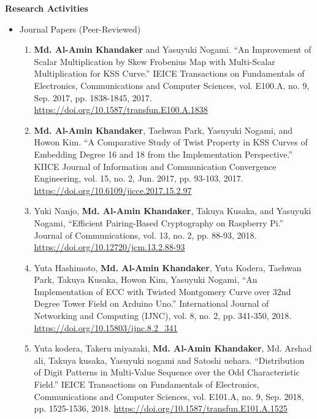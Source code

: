 
\newpage
\pagestyle{plain}
\textbf{\huge Research Activities}\label{research_activity}
\vspace{10mm}\\
\begin{itemize}
\large
\item Journal Papers (Peer-Reviewed)
\normalsize
\begin{enumerate}
		
	\item \textbf{Md. Al-Amin Khandaker} and Yasuyuki Nogami. ``An Improvement of Scalar Multiplication by Skew Frobenius Map with Multi-Scalar Multiplication for KSS Curve.'' IEICE Transactions on Fundamentals of Electronics, Communications and Computer Sciences, vol. E100.A, no. 9, Sep. 2017, pp. 1838-1845, 2017. \url{https://doi.org/10.1587/transfun.E100.A.1838}
	
	\item \textbf{Md. Al-Amin Khandaker}, Taehwan Park, Yasuyuki Nogami, and Howon Kim. ``A Comparative Study of Twist Property in KSS Curves of Embedding Degree 16 and 18 from the Implementation Perspective.'' KIICE Journal of Information and Communication Convergence Engineering, vol. 15, no. 2, Jun. 2017, pp. 93-103, 2017. \url{https://doi.org/10.6109/jicce.2017.15.2.97}
	
	\item Yuki Nanjo,  \textbf{Md. Al-Amin Khandaker}, Takuya Kusaka, and Yasuyuki Nogami, ``Efficient Pairing-Based Cryptography on Raspberry Pi.'' Journal of Communications, vol. 13, no. 2, pp. 88-93, 2018.  \url{https://doi.org/10.12720/jcm.13.2.88-93} 
		
	\item Yuta Hashimoto,  \textbf{Md. Al-Amin Khandaker}, Yuta Kodera, Taehwan Park, Takuya Kusaka, Howon Kim, Yasuyuki Nogami, ``An Implementation of ECC with Twisted Montgomery Curve over 32nd Degree Tower Field on Arduino Uno.'' International Journal of Networking and Computing (IJNC), vol. 8, no. 2, pp. 341-350, 2018.
	\url{https://doi.org/10.15803/ijnc.8.2_341}
	
	\item Yuta kodera, Takeru miyazaki, \textbf{Md. Al-Amin Khandaker},  Md. Arshad ali, Takuya kusaka, Yasuyuki nogami and Satoshi uehara. ``Distribution of Digit Patterns in Multi-Value Sequence over the Odd Characteristic Field.'' IEICE Transactions on Fundamentals of Electronics, Communications and Computer Sciences, vol. E101.A, no. 9, Sep. 2018, pp. 1525-1536, 2018. \url{https://doi.org/10.1587/transfun.E101.A.1525}
	

\end{enumerate}
\end{itemize}
